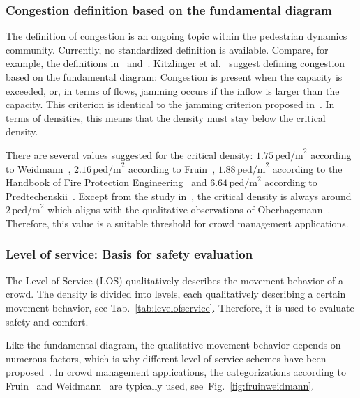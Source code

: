 \subsubsection{Congestion definition based on the fundamental diagram}
The definition of congestion is an ongoing topic within the pedestrian dynamics community. Currently, no standardized definition is available. Compare, for example, the definitions in~\cite{rimea-2016-cdyn} and~\cite{kitzlinger-2020-cdyn}.
Kitzlinger et al.~\cite{kitzlinger-2020-cdyn} suggest defining congestion based on the fundamental diagram: Congestion is present when the capacity is exceeded, or, in terms of flows, jamming occurs if the inflow is larger than the capacity. This criterion is identical to the jamming criterion proposed in~\cite{schadschneider-2009-cdyn,zhang-2011-cdyn}. 
In terms of densities, this means that the density must stay below the critical density.

There are several values suggested for the critical density: $1.75\,\text{ped/m}^2$ according to Weidmann~\cite{weidmann-1994-cdyn}, $2.16\,\text{ped/m}^2$ according to Fruin~\cite{fruin-1971-cdyn}, $1.88\,\text{ped/m}^2$ according to the Handbook of Fire Protection Engineering~\cite{hurley-2016-cdyn} and $6.64\,\text{ped/m}^2$ according to Predtechenskii~\cite{predtechenskii-1968-cdyn}. Except from the study in~\cite{predtechenskii-1968-cdyn}, the critical density is always around $2\,\text{ped/m}^2$ which aligns with the qualitative observations of Oberhagemann~\cite{oberhagemann-2012-cdyn}. Therefore, this value is a suitable threshold for crowd management applications.

\subsubsection{Level of service: Basis for safety evaluation}

The Level of Service (LOS) qualitatively describes the movement behavior of a crowd. The density is divided into levels, each qualitatively describing a certain movement behavior, see Tab.~\ref{tab:levelofservice}. Therefore, it is used to evaluate safety and comfort. 

Like the fundamental diagram, the qualitative movement behavior depends on numerous factors, which is why different level of service schemes have been proposed~\cite{yadav-2024-cdyn}. In crowd management applications, the categorizations according to Fruin~\cite{fruin-1971-cdyn} and Weidmann~\cite{weidmann-1994-cdyn} are typically used, see~Fig.~\ref{fig:fruinweidmann}. 



